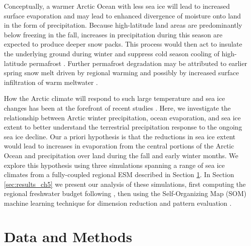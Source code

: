 Conceptually, a warmer Arctic Ocean with less sea ice will lead to increased surface evaporation and may lead to enhanced divergence of moisture onto land in the form of precipitation.
Because high-latitude land areas are predominantly below freezing in the fall, increases in precipitation during this season are expected to produce deeper snow packs.
This process would then act to insulate the underlying ground during winter and suppress cold season cooling of high-latitude permafrost \citep{Osterkamp_1999,Zhang_2005,Lawrence_2010}.
Further permafrost degradation may be attributed to earlier spring snow melt driven by regional warming and possibly by increased surface infiltration of warm meltwater \citep{Lawrence_2010}.

How the Arctic climate will respond to such large temperature and sea ice changes has been at the forefront of recent studies \citep[e.g. ][]{Kazutoshi_2014,Simmonds_2014,Wegmann_2015,Vihma_2014}.
Here, we investigate the relationship between Arctic winter precipitation, ocean evaporation, and sea ice extent to better understand the terrestrial precipitation response to the ongoing sea ice decline.
Our a priori hypothesis is that the reductions in sea ice extent would lead to increases in evaporation from the central portions of the Arctic Ocean and precipitation over land during the fall and early winter months.
We explore this hypothesis using three simulations spanning a range of sea ice climates from a fully-coupled regional ESM described in Section \ref{sec:data_models_ch5}.
In Section \ref{sec:results_ch5} we present our analysis of these simulations, first computing the regional freshwater budget following \citet{Serreze_2006a}, then using the Self-Organizing Map (SOM) machine learning technique for dimension reduction and pattern evaluation \citep{Kohonen_1998,Hewitson_2002}.

\section{Data and Methods}
\label{sec:data_models_ch5}

